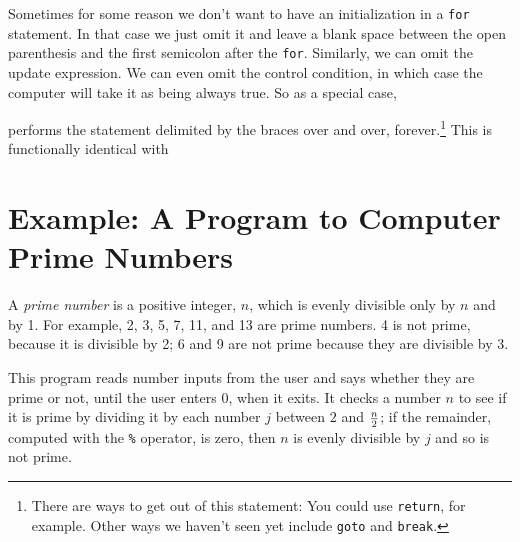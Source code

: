 Sometimes for some reason we don't want to have an initialization in a
{\tt for} statement.  In that case we just omit it and leave a blank
space between the open parenthesis and the first semicolon after the
{\tt for}.  Similarly, we can omit the update expression.  We can even
omit the control condition, in which case the computer will take it as
being always true.  So as a special case, 

\begin{flushleft}
\verb% for ( ; ; ) { ... } %
\end{flushleft}

\noindent performs the statement delimited by the braces over and over,
forever.\footnote{There are ways to get out of this statement:  You
could use {\tt return}, for example.  Other ways we haven't seen yet
include {\tt goto} and {\tt break}.}  This is functionally identical with

\begin{flushleft}
\verb% while ( 1 ) { ... } %
\end{flushleft}

\section{Example: A Program to Computer Prime Numbers}

A {\em prime number} is a positive integer, $n$, which is evenly
divisible only by $n$ and by 1.  For example, 2, 3, 5, 7, 11, and 13 are
prime numbers.  4 is not prime, because it is divisible by 2; 6 and 9
are not prime because they are divisible by 3.

This program reads number inputs from the user and says whether they are
prime or not, until the user enters 0, when it exits.  It checks a
number $n$ to see if it is prime by dividing it by each number $j$ between
$2$ and $n\over 2$; if the remainder, computed with the {\tt\%}
operator, is zero, then $n$ is evenly divisible by $j$ and so is not
prime.  




